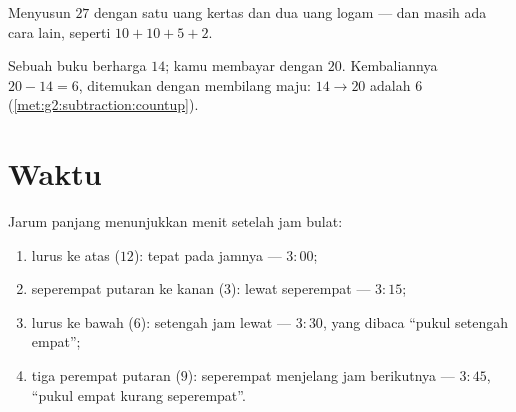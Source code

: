 \begin{omfigure}

{\small Menyusun $27$ dengan satu uang kertas dan dua uang logam ---
dan masih ada cara lain, seperti $10 + 10 + 5 + 2$.}
\end{omfigure}

\begin{example}[Kembalian]\label{ex:g2:measure:change}
Sebuah buku berharga $14$; kamu membayar dengan $20$. Kembaliannya
$20 - 14 = 6$, ditemukan dengan membilang maju: $14 \to 20$ adalah
$6$ (\cref{met:g2:subtraction:countup}).
\end{example}

\section{Waktu}

\begin{method}\label{met:g2:measure:clock}
Jarum panjang menunjukkan menit setelah jam bulat:
\begin{enumerate}
  \item lurus ke atas ($12$): tepat pada jamnya --- $3{:}00$;
  \item seperempat putaran ke kanan ($3$): lewat seperempat ---
        $3{:}15$;
  \item lurus ke bawah ($6$): setengah jam lewat --- $3{:}30$, yang
        dibaca ``pukul setengah empat'';
  \item tiga perempat putaran ($9$): seperempat menjelang jam
        berikutnya --- $3{:}45$, ``pukul empat kurang seperempat''.
\end{enumerate}
\end{method}


